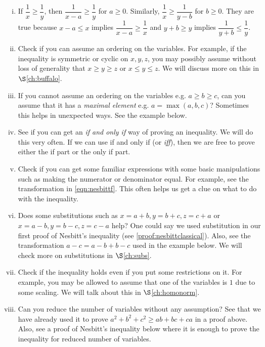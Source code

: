 \documentclass{subfile}
\begin{document}
		\begin{enumerate}[(i)]
			\item If $\dfrac{1}{x}\geq\dfrac{1}{y}$, then $\dfrac{1}{x-a}\geq\dfrac{1}{y}$ for $a\geq0$. Similarly, $\dfrac{1}{x}\geq\dfrac{1}{y-b}$ for $b\geq0$. They are true because $x-a\leq x$ implies $\dfrac{1}{x-a}\geq\dfrac{1}{x}$ and $y+b\geq y$ implies $\dfrac{1}{y+b}\leq\dfrac{1}{y}$.
			\item Check if you can assume an ordering on the variables. For example, if the inequality is symmetric or cyclic on $x,y,z$, you may possibly assume without loss of generality that $x\geq y\geq z$ or $x\leq y\leq z$. We will discuss more on this in \hyperref[ch:buffalo]{$\S$\ref{ch:buffalo}}.
			\item If you cannot assume an ordering on the variables e.g. $a\geq b\geq c$, can you assume that it has a \emph{maximal element} e.g. $a=\max(a,b,c)$? Sometimes this helps in unexpected ways. See the example below.
			\item See if you can get an \emph{if and only if} way of proving an inequality. We will do this very often. If we can use if and only if (or \emph{iff}), then we are free to prove either the if part or the only if part.
			\item Check if you can get some familiar expressions with some basic manipulations such as making the numerator or denominator equal. For example, see the transformation in \hyperref[eqn:nesbittf]{\ref{eqn:nesbittf}}. This often helps us get a clue on what to do with the inequality.
			\item Does some substitutions such as $x=a+b,y=b+c,z=c+a$ or $x=a-b,y=b-c,z=c-a$ help? One could say we used substitution in our first proof of Nesbitt's inequality (see \autoref{proof:nesbittclassical}). Also, see the transformation $a-c=a-b+b-c$ used in the example below. We will check more on substitutions in \hyperref[ch:subs]{$\S$\ref{ch:subs}}.
			\item Check if the inequality holds even if you put some restrictions on it. For example, you may be allowed to assume that one of the variables is $1$ due to some scaling. We will talk about this in \hyperref[ch:homonorm]{$\S$\ref{ch:homonorm}}.
			\item Can you reduce the number of variables without any assumption? See that we have already used it to prove $a^2+b^2+c^2\geq ab+bc+ca$ in a proof above. Also, see a proof of Nesbitt's inequality below where it is enough to prove the inequality for reduced number of variables.
		\end{enumerate}
\end{document}
